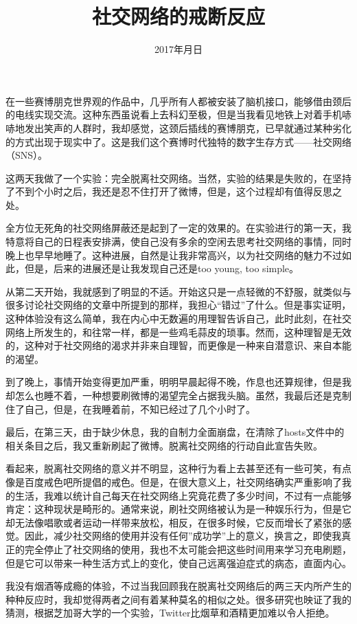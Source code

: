 
\title{社交网络的戒断反应}
\date{2017\sp 年\sp 月\sp 日}

在一些赛博朋克世界观的作品中，几乎所有人都被安装了脑机接口，能够借由颈后的电线实现交流。这种东西虽说看上去科幻至极，但是当我看见地铁上对着手机哧哧地发出笑声的人群时，我却感觉，这颈后插线的赛博朋克，已早就通过某种劣化的方式出现于现实中了。这是我们这个赛博时代独特的数字生存方式——社交网络（SNS）。

这两天我做了一个实验：完全脱离社交网络。当然，实验的结果是失败的，在坚持了不到\sp 个小时之后，我还是忍不住打开了微博，但是，这个过程却有值得反思之处。

全方位无死角的社交网络屏蔽还是起到了一定的效果的。在实验进行的第一天，我特意将自己的日程表安排满，使自己没有多余的空闲去思考社交网络的事情，同时晚上也早早地睡了。这种进展，自然是让我非常高兴，以为社交网络的魅力不过如此，但是，后来的进展还是让我发现自己还是\sp too young, too simple。

从第二天开始，我就感到了明显的不适。开始这只是一点轻微的不舒服，就类似与很多讨论社交网络的文章中所提到的那样，我担心“错过”了什么。但是事实证明，这种体验没有这么简单，我在内心中无数遍的用理智告诉自己，此时此刻，在社交网络上所发生的，和往常一样，都是一些鸡毛蒜皮的琐事。然而，这种理智是无效的，这种对于社交网络的渴求并非来自理智，而更像是一种来自潜意识、来自本能的渴望。

到了晚上，事情开始变得更加严重，明明早晨起得不晚，作息也还算规律，但是我却怎么也睡不着，一种想要刷微博的渴望完全占据我头脑。虽然，我最后还是克制住了自己，但是，在我睡着前，不知已经过了几个小时了。

最后，在第三天，由于缺少休息，我的自制力全面崩盘，在清除了\sp hosts\sp 文件中的相关条目之后，我又重新刷起了微博。脱离社交网络的行动自此宣告失败。

看起来，脱离社交网络的意义并不明显，这种行为看上去甚至还有一些可笑，有点像是百度戒色吧所提倡的戒色。但是，在很大意义上，社交网络确实严重影响了我的生活，我难以统计自己每天在社交网络上究竟花费了多少时间，不过有一点能够肯定：这种现状是畸形的。通常来说，刷社交网络被认为是一种娱乐行为，但是它却无法像唱歌或者运动一样带来放松，相反，在很多时候，它反而增长了紧张的感觉。因此，减少社交网络的使用并没有任何”成功学”上的意义，换言之，即使我真正的完全停止了社交网络的使用，我也不太可能会把这些时间用来学习充电刷题，但是它可以带来一种生活方式上的变化，使自己远离强迫症式的病态，直面内心。

我没有烟酒等成瘾的体验，不过当我回顾我在脱离社交网络后的两三天内所产生的种种反应时，我却觉得两者之间有着某种莫名的相似之处。很多研究也映证了我的猜测，根据芝加哥大学的一个实验，Twitter\sp 比烟草和酒精更加难以令人拒绝。

\bye
